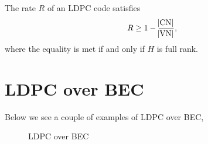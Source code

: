 \begin{theorem}
    The rate $R$ of an LDPC code satisfies
    \begin{equation}
        R \ge 1- \frac{\abs{\mathrm{CN}}}{\abs{\mathrm{VN}}},
    \end{equation}
    where the equality is met if and only if $H$ is full rank.
\end{theorem}



\section{LDPC over BEC}
Below we see a couple of examples of LDPC over BEC,

\begin{figure}
    \centering
    \hspace{1cm}
    \hspace{1cm}
    \caption{LDPC over BEC}
\end{figure}

